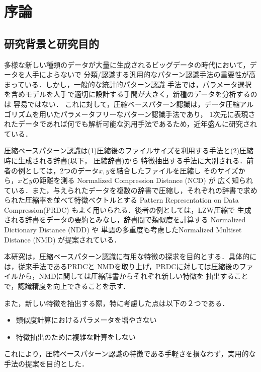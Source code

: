 \chapter{序論}
\section{研究背景と研究目的} %
\label{sec:研究背景と研究目的}


多様な新しい種類のデータが大量に生成されるビッグデータの時代において，データを人手によらないで
分類/認識する汎用的なパターン認識手法の重要性が高まっている．しかし，一般的な統計的パターン認識
手法では，パラメータ選択を含めモデルを人手で適切に設計する手間が大きく，新種のデータを分析するのは
容易ではない．
これに対して，圧縮ベースパターン認識は，データ圧縮アルゴリズムを用いたパラメータフリーなパターン認識手法であり，
1次元に表現されたデータであれば何でも解析可能な汎用手法であるため，近年盛んに研究されている．

圧縮ベースパターン認識は(1)圧縮後のファイルサイズを利用する手法と(2)圧縮時に生成される辞書(以下，
圧縮辞書)から
特徴抽出する手法に大別される．前者の例としては，2つのデータ$x,y$を結合したファイルを圧縮し
そのサイズから，$x$と$y$の距離を測る Normalized Compression Distance (NCD) \cite{NCD} が
広く知られている．また，与えられたデータを複数の辞書で圧縮し，それぞれの辞書で求められた圧縮率を並べて特徴ベクトルとする
Pattern Representation on Data Compression(PRDC) \cite{PRDC} もよく用いられる．後者の例としては，LZW圧縮で
生成される辞書をデータの要約とみなし，辞書間で類似度を計算する Normalized Dictionary Distance (NDD) \cite{NDD}や
単語の多重度も考慮したNormalized Multiset Distance (NMD) \cite{NMD}が提案されている．

本研究は，圧縮ベースパターン認識に有用な特徴の探求を目的とする．具体的には，従来手法であるPRDCと
NMDを取り上げ，PRDCに対しては圧縮後のファイルから，NMDに関しては圧縮辞書からそれぞれ新しい特徴を
抽出することで，認識精度を向上できることを示す．

また，新しい特徴を抽出する際，特に考慮した点は以下の２つである．
\begin{itemize}
	\item 類似度計算におけるパラメータを増やさない
	\item 特徴抽出のために複雑な計算をしない
\end{itemize}
これにより，圧縮ベースパターン認識の特徴である手軽さを損なわず，実用的な手法の提案を目的とした．



